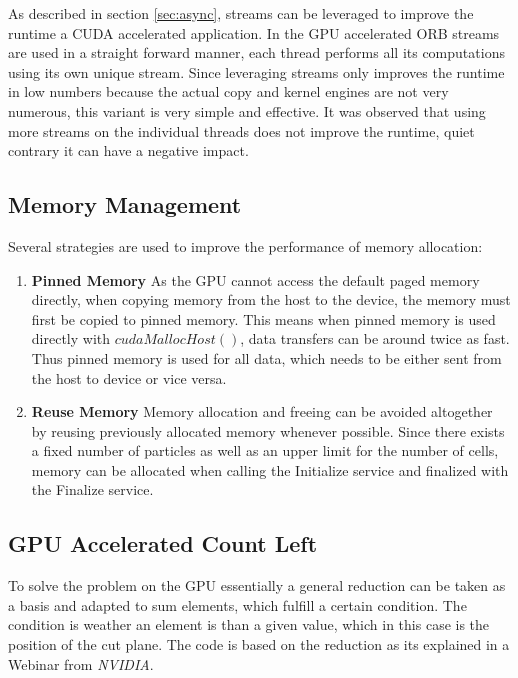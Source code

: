 \documentclass[]{article}
\begin{document}
As described in section \ref{sec:async}, streams can be leveraged to improve the runtime a CUDA accelerated application. In the GPU accelerated ORB streams are used in a straight forward manner, each thread performs all its computations using its own unique stream. Since leveraging streams only improves the runtime in low numbers because the actual copy and kernel engines are not very numerous, this variant is very simple and effective. It was observed that using more streams on the individual threads does not improve the runtime, quiet contrary it can have a negative impact. 


\subsection{Memory Management}

Several strategies are used to improve the performance of memory allocation: 

\begin{enumerate}
	\item \textbf{Pinned Memory} As the GPU cannot access the default paged memory directly, when copying memory from the host to the device, the memory must first be copied to pinned memory. This means when pinned memory is used directly with $cudaMallocHost()$, data transfers can be around twice as fast. Thus pinned memory is used for all data, which needs to be either sent from the host to device or vice versa.
	\item \textbf{Reuse Memory} Memory allocation and freeing can be avoided altogether by reusing previously allocated memory whenever possible. Since there exists a fixed number of particles as well as an upper limit for the number of cells, memory can be allocated when calling the Initialize service and finalized with the Finalize service.
\end{enumerate}

\subsection{GPU Accelerated Count Left}

To solve the problem on the GPU essentially a general reduction can be taken as a basis and adapted to sum elements, which fulfill a certain condition. The condition is weather an element is than a given value, which in this case is the position of the cut plane. The code is based on the reduction as its explained in a Webinar from \textit{NVIDIA}. \cite{reduction}
\end{document}
